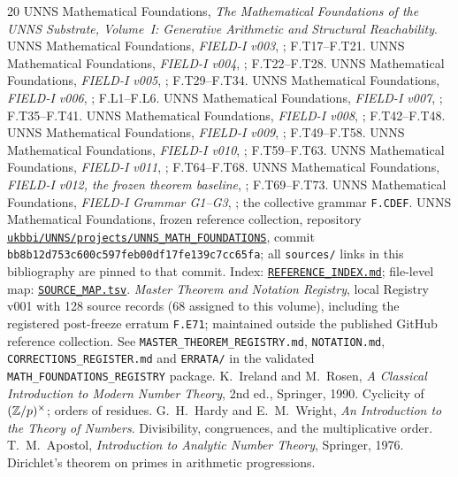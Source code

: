 \begin{thebibliography}{20}
 UNNS Mathematical Foundations, \emph{The Mathematical Foundations of the UNNS Substrate, Volume~I: Generative Arithmetic and Structural Reachability}.
 UNNS Mathematical Foundations, \emph{FIELD-I v003}, ; F.T17--F.T21.
 UNNS Mathematical Foundations, \emph{FIELD-I v004}, ; F.T22--F.T28.
 UNNS Mathematical Foundations, \emph{FIELD-I v005}, ; F.T29--F.T34.
 UNNS Mathematical Foundations, \emph{FIELD-I v006}, ; F.L1--F.L6.
 UNNS Mathematical Foundations, \emph{FIELD-I v007}, ; F.T35--F.T41.
 UNNS Mathematical Foundations, \emph{FIELD-I v008}, ; F.T42--F.T48.
 UNNS Mathematical Foundations, \emph{FIELD-I v009}, ; F.T49--F.T58.
 UNNS Mathematical Foundations, \emph{FIELD-I v010}, ; F.T59--F.T63.
 UNNS Mathematical Foundations, \emph{FIELD-I v011}, ; F.T64--F.T68.
 UNNS Mathematical Foundations, \emph{FIELD-I v012, the frozen theorem baseline}, ; F.T69--F.T73.
 UNNS Mathematical Foundations, \emph{FIELD-I Grammar G1--G3}, ; the collective grammar \texttt{F.CDEF}.
 UNNS Mathematical Foundations, frozen reference collection, repository \href{https://github.com/ukbbi/UNNS/tree/bb8b12d753c600c597feb00df17fe139c7cc65fa/projects/UNNS_MATH_FOUNDATIONS}{\nolinkurl{ukbbi/UNNS/projects/UNNS_MATH_FOUNDATIONS}}, commit \texttt{bb8b12d753c600c597feb00df17fe139c7cc65fa}; all \texttt{sources/} links in this bibliography are pinned to that commit. Index: \href{https://github.com/ukbbi/UNNS/blob/bb8b12d753c600c597feb00df17fe139c7cc65fa/projects/UNNS_MATH_FOUNDATIONS/REFERENCE_INDEX.md}{\nolinkurl{REFERENCE_INDEX.md}}; file-level map: \href{https://github.com/ukbbi/UNNS/blob/bb8b12d753c600c597feb00df17fe139c7cc65fa/projects/UNNS_MATH_FOUNDATIONS/SOURCE_MAP.tsv}{\nolinkurl{SOURCE_MAP.tsv}}.
 \emph{Master Theorem and Notation Registry}, local Registry v001 with 128 source records (68 assigned to this volume), including the registered post-freeze erratum \texttt{F.E71}; maintained outside the published GitHub reference collection. See \texttt{MASTER\_THEOREM\_REGISTRY.md}, \texttt{NOTATION.md}, \texttt{CORRECTIONS\_REGISTER.md} and \texttt{ERRATA/} in the validated \texttt{MATH\_FOUNDATIONS\_REGISTRY} package.
 K.~Ireland and M.~Rosen, \emph{A Classical Introduction to Modern Number Theory}, 2nd ed., Springer, 1990. Cyclicity of \((\mathbb{Z}/p)^\times\); orders of residues.
 G.~H.~Hardy and E.~M.~Wright, \emph{An Introduction to the Theory of Numbers}. Divisibility, congruences, and the multiplicative order.
 T.~M.~Apostol, \emph{Introduction to Analytic Number Theory}, Springer, 1976. Dirichlet's theorem on primes in arithmetic progressions.
\end{thebibliography}
